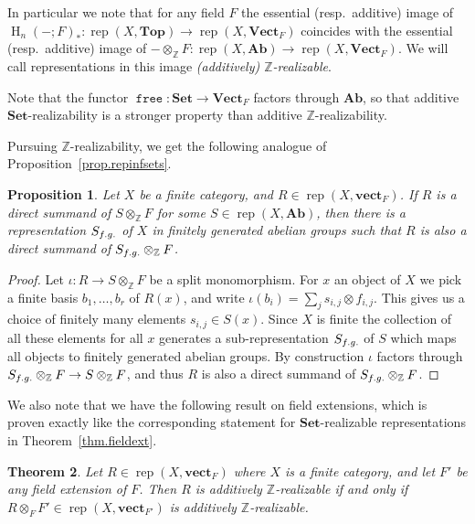 \documentclass[a4paper]{amsart}
\theoremstyle{plain}
\newtheorem{theorem}{Theorem}[section]
\newtheorem{proposition}[theorem]{Proposition}
\theoremstyle{definition}
\theoremstyle{remark}
\newcommand{\funct}[1]{\operatorname{\mathtt{#1}}}
\newcommand{\Top}{\mathbf{Top}}
\newcommand{\Set}{\mathbf{Set}}
\newcommand{\vect}{\mathbf{vect}}
\newcommand{\VectF}{\mathbf{Vect}_F}
\newcommand{\vectF}{\mathbf{vect}_F}
\newcommand{\Z}{\mathbb{Z}}
\DeclareMathOperator{\rep}{rep}
\begin{document}
In particular we note that for any field \( F \) the essential (resp.\ additive) image of \( \operatorname{H}_n(-;F)_* \colon \rep(X, \Top) \to \rep(X, \VectF) \) coincides with the essential (resp.\ additive) image of \( - \otimes_{\Z} F \colon \rep(X, \mathbf{Ab}) \to \rep(X, \VectF) \). We will call representations in this image \emph{(additively) \( \Z \)-realizable}.

Note that the functor \( \funct{free} \colon \Set \to \VectF \) factors through \( \mathbf{Ab} \), so that additive \( \Set \)-realizability is a stronger property than additive \( \Z \)-realizability.

\medskip
Pursuing \( \Z \)-realizability, we get the following analogue of Proposition~\ref{prop.repinfsets}.

\begin{proposition} \label{prop.reduction_to_Ab_fg}
Let \( X \) be a finite category, and \( R \in \rep(X, \vectF) \). If \( R \) is a direct summand of \( S \otimes_{\Z} F \) for some \( S \in \rep(X, \mathbf{Ab}) \), then there is a representation \( S_{\rm f.g.} \) of \( X \) in finitely generated abelian groups such that \( R \) is also a direct summand of \( S_{\rm f.g.} \otimes_{\Z} F \).
\end{proposition}

\begin{proof}
Let \( \iota \colon R \to S \otimes_{\Z} F \) be a split monomorphism. For \( x \) an object of \( X \) we pick a finite basis \( b_1, \ldots, b_r \) of \( R(x) \), and write \( \iota(b_i) = \sum_j s_{i,j} \otimes f_{i,j} \). This gives us a choice of finitely many elements \( s_{i,j} \in S(x) \). Since \( X \) is finite the collection of all these elements for all \( x \) generates a sub-representation \( S_{\rm f.g.} \) of \( S \) which maps all objects to finitely generated abelian groups. By construction \( \iota \) factors through \( S_{\rm f.g.} \otimes_{\Z} F \to S \otimes_{\Z} F \), and thus \( R \) is also a direct summand of \( S_{\rm f.g.} \otimes_{\Z} F \).
\end{proof}

We also note that we have the following result on field extensions, which is proven exactly like the corresponding statement for \( \Set \)-realizable representations in Theorem~\ref{thm.fieldext}.

\begin{theorem}\label{thm.fieldext_for_Z}
Let $R\in \rep(X, \vectF)$ where $X$ is a finite category, and let $F'$ be any field extension of $F$. Then $R$ is additively $\Z$-realizable if and only if $R\otimes_F F' \in \rep(X, \vect_{F'})$ is additively $\Z$-realizable.
\end{theorem}
\end{document}
